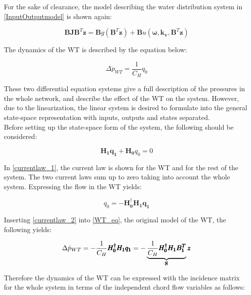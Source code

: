 For the sake of clearance, the model describing the water distribution system in \eqref{InputOutputmodel} is shown again:  

\begin{equation}
 \pmb{B}\pmb{J {B}}^T \pmb{\dot{z}} = \pmb{B} g(\pmb{B}^T \pmb{z})+ \pmb{B} u(\pmb{\omega},\pmb{k_v	}, \pmb{B}^T \pmb{z})
 \label{InputOutputmodel}
\end{equation}

The dynamics of the WT is described by the equation below: 

\begin{equation}
\Delta \dot{p}_{WT} = \frac{1}{C_H} q_0
 \label{WT_eq}
\end{equation}

These two differential equation systems give a full description of the pressures in the whole network, and  describe the effect of the WT on the system. However, due to the linearization, the linear system is desired to formulate into the general state-space representation with inputs, outputs and states separated. 
\\
Before setting up the state-space form of the system, the following should be considered: 

\begin{equation}
 \pmb{H_1}\pmb{q_1} + \pmb{H_0}q_0 = 0 
 \label{currentlaw_1}
\end{equation}

In \eqref{currentlaw_1}, the current law is shown for the WT and for the rest of the system. The two current laws sum up to zero taking into account the whole system. Expressing the flow in the WT yields:

\begin{equation}
q_0 = -\pmb{H^{\dagger}_0}\pmb{H_1}\pmb{q_1}
 \label{currentlaw_2}
\end{equation}

Inserting \eqref{currentlaw_2} into \eqref{WT_eq}, the original model of the WT, the following yields:

\begin{equation}
\Delta \dot{p}_{WT} = - \frac{1}{C_H} \pmb{H^{\dagger}_0}\pmb{H_1}\pmb{q_1} = - \underbrace{\frac{1}{C_H} \pmb{H^{\dagger}_0}\pmb{H_1}\pmb{{B_1^{T}}}}_\text{\pmb{S}} \pmb{z}
 \label{currentlaw_3}
\end{equation}

Therefore the dynamics of the WT can be expressed with the incidence matrix for the whole system in terms of the independent chord flow variables as follows: 

